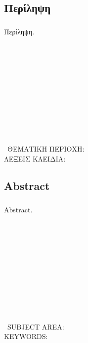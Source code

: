 \documentclass[12pt,twoside,openright]{report}
\begin{document}

\begin{doublespacing}
\chapter*{Περίληψη}
\end{doublespacing}
\thispagestyle{empty}
\normalsize
\doublespacing
\paragraph[]{} Περίληψη. \\\\\\\\\\\\\\\\\\\\\\\\\
ΘΕΜΑΤΙΚΗ ΠΕΡΙΟΧΗ: \\
ΛΕΞΕΙΣ ΚΛΕΙΔΙΑ:  \\

\clearpage\newpage
\begin{doublespacing}
\chapter*{\lt Abstract}
\end{doublespacing}
\thispagestyle{empty}
\normalsize
\doublespacing
\paragraph[]{} \lt Abstract. \\\\\\\\\\\\\\\\\\\\\\\\\
SUBJECT AREA: \\
KEYWORDS:  \\
\gt
\end{document}

